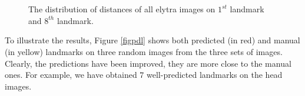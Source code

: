 \documentclass[review]{elsarticle}
\begin{document}
\begin{figure}[h!]
    \centering
    ~~
    \\
    ~~
    \caption{The distribution of distances of all elytra images on $1^{st}$ landmark and $8^{th}$ landmark.}
    \label{figchartefn}
\end{figure}

To illustrate the results, Figure \ref{figpdl} shows both predicted (in red) and manual (in yellow) landmarks on three random images from the three sets of images. Clearly, the predictions have been improved, they are more close to the manual ones. For example, we have obtained $7$ well-predicted landmarks on the head images.
\end{document}

